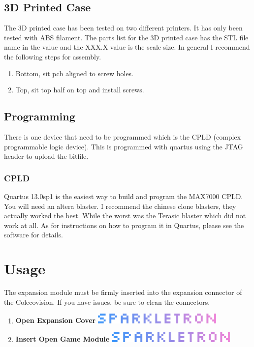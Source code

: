 \subsection{3D Printed Case}

\par
The 3D printed case has been tested on two different printers. It has only been tested with ABS filament.
The parts list for the 3D printed case has the STL file name in the value and the XXX.X value is the scale size.
In general I recommend the following steps for assembly.

\begin{enumerate}
  \item Bottom, sit pcb aligned to screw holes.
  \item Top, sit top half on top and install screws.
\end{enumerate}

\subsection{Programming}

\par
There is one device that need to be programmed which is the CPLD (complex programmable logic device).
This is programmed with quartus using the JTAG header to upload the bitfile.

\subsubsection{CPLD}

\par
Quartus 13.0sp1 is the easiest way to build and program the MAX7000 CPLD. You will need an altera blaster.
I recommend the chinese clone blasters, they actually worked the best. While the worst was the Terasic blaster
which did not work at all. As for instructions on how to program it in Quartus, please see the software for details.

\newpage

\section{Usage}

\par
The expansion module must be firmly inserted into the expansion connector of the Colecovision. If you have issues, be sure
to clean the connectors.

\begin{enumerate}
  \item \textbf{Open Expansion Cover} \includegraphics[width=0.50\textwidth,keepaspectratio]{img/SPARKLETRON.png}
  \item \textbf{Insert Open Game Module} \includegraphics[width=0.50\textwidth,keepaspectratio]{img/SPARKLETRON.png}
\end{enumerate}

